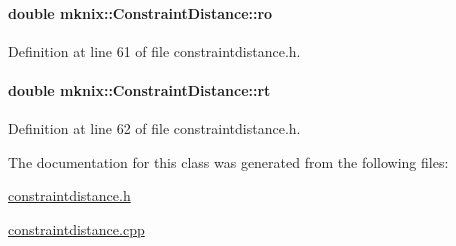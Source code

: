 \paragraph[{ro}]{\setlength{\rightskip}{0pt plus 5cm}double mknix\+::\+Constraint\+Distance\+::ro\hspace{0.3cm}{\ttfamily [protected]}}\label{classmknix_1_1_constraint_distance_a2d4a4e3c3b75b23f63a772b71c4badaa}


Definition at line 61 of file constraintdistance.\+h.

\hypertarget{classmknix_1_1_constraint_distance_ae4054619a2e3205079c4911ad69db4eb}{}
\paragraph[{rt}]{\setlength{\rightskip}{0pt plus 5cm}double mknix\+::\+Constraint\+Distance\+::rt\hspace{0.3cm}{\ttfamily [protected]}}\label{classmknix_1_1_constraint_distance_ae4054619a2e3205079c4911ad69db4eb}


Definition at line 62 of file constraintdistance.\+h.



The documentation for this class was generated from the following files\+:\begin{DoxyCompactItemize}
\item 
\hyperlink{constraintdistance_8h}{constraintdistance.\+h}\item 
\hyperlink{constraintdistance_8cpp}{constraintdistance.\+cpp}\end{DoxyCompactItemize}
